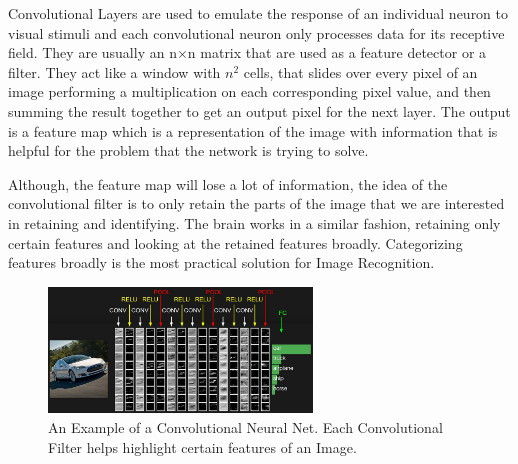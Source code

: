 \documentclass{ieee}
\begin{document}
Convolutional Layers are used to emulate the response of an individual neuron to visual stimuli and each convolutional neuron only processes data for its receptive field. They are usually an n$\times$n matrix that are used as a feature detector or a filter. They act like a window with $n^2$ cells, that slides over every pixel of an image  performing a multiplication on each corresponding pixel value, and then summing the result together to get an output pixel for the next layer. The output is a feature map which is a representation of the image with information that is helpful for the problem that the network is trying to solve.

Although, the feature map will lose a lot of information, the idea of the convolutional filter is to only retain the parts of the image that we are interested in retaining and identifying.
 The brain works in a similar fashion, retaining only certain features and looking at the retained features broadly. Categorizing features broadly is the most practical solution for Image Recognition.
 \begin{figure}[h]
    \begin{center}
    \includegraphics[width=7cm]{images/convnet.jpeg}
    \end{center}
    \label{mbconv_fig}
    \caption{An Example of a Convolutional Neural Net. Each Convolutional Filter helps highlight certain features of an Image. \cite{CONVNETIMAGE}}
\end{figure}
\end{document}
